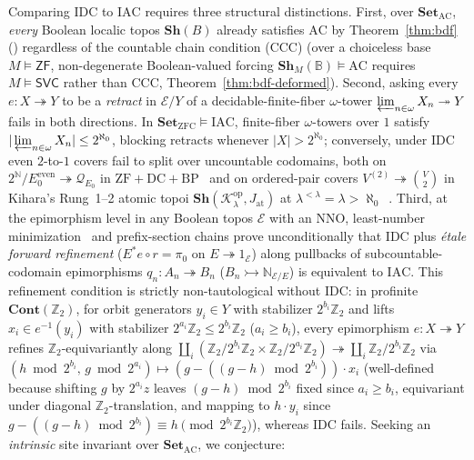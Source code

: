 Comparing $\mathrm{IDC}$ to $\mathrm{IAC}$ requires three structural distinctions. First, over $\mathbf{Set}_{\mathrm{AC}}$, \emph{every} Boolean localic topos $\mathbf{Sh}(B)$ already satisfies $\mathrm{AC}$ by Theorem~\ref{thm:bdf}~\cite{Barr74} (\cite[\S D4.5]{Johnstone02}) regardless of the countable chain condition ($\mathrm{CCC}$) (over a choiceless base $M \models \mathsf{ZF}$, non-degenerate Boolean-valued forcing $\mathbf{Sh}_M(\mathbb{B}) \models \mathrm{AC}$ requires $M \models \mathsf{SVC}$ rather than $\mathrm{CCC}$, Theorem~\ref{thm:bdf-deformed}). Second, asking every $e : X \twoheadrightarrow Y$ to be a \emph{retract} in $\mathcal{E}/Y$ of a decidable-finite-fiber $\omega$-tower $\varprojlim_{n \in \omega} X_n \twoheadrightarrow Y$ fails in both directions. In $\mathbf{Set}_{\mathrm{ZFC}} \models \mathrm{IAC}$, finite-fiber $\omega$-towers over $1$ satisfy $|\varprojlim_{n \in \omega} X_n| \le 2^{\aleph_0}$, blocking retracts whenever $|X| > 2^{\aleph_0}$; conversely, under $\mathrm{IDC}$ even $2$-to-$1$ covers fail to split over uncountable codomains, both on $2^{\mathbb{N}}/E_0^{\mathrm{even}} \twoheadrightarrow \mathcal{Q}_{E_0}$ in $\mathrm{ZF}+\mathrm{DC}+\mathrm{BP}$~\cite{Serafin23} and on ordered-pair covers $V^{(2)} \twoheadrightarrow \binom{V}{2}$ in Kihara's Rung~1--2 atomic topoi $\mathbf{Sh}(\mathcal{K}_\lambda^{\mathrm{op}}, J_{\mathrm{at}})$ at $\lambda^{<\lambda}=\lambda>\aleph_0$~\cite{Kihara26}. Third, at the epimorphism level in any Boolean topos $\mathcal{E}$ with an $\mathrm{NNO}$, least-number minimization~\cite[\S D5.1]{Johnstone02} and prefix-section chains prove unconditionally that $\mathrm{IDC}$ plus \emph{\'etale forward refinement} ($E^* e \circ r = \pi_0$ on $E \twoheadrightarrow 1_{\mathcal{E}}$) along pullbacks of subcountable-codomain epimorphisms $q_n : A_n \twoheadrightarrow B_n$ ($B_n \rightarrowtail \mathbb{N}_{\mathcal{E}/E}$) is equivalent to $\mathrm{IAC}$. This refinement condition is strictly non-tautological without $\mathrm{IDC}$: in profinite $\mathbf{Cont}(\mathbb{Z}_2)$, for orbit generators $y_i \in Y$ with stabilizer $2^{b_i}\mathbb{Z}_2$ and lifts $x_i \in e^{-1}(y_i)$ with stabilizer $2^{a_i}\mathbb{Z}_2 \le 2^{b_i}\mathbb{Z}_2$ ($a_i \ge b_i$), every epimorphism $e : X \twoheadrightarrow Y$ refines $\mathbb{Z}_2$-equivariantly along $\coprod_i (\mathbb{Z}_2/2^{b_i}\mathbb{Z}_2 \times \mathbb{Z}_2/2^{a_i}\mathbb{Z}_2) \twoheadrightarrow \coprod_i \mathbb{Z}_2/2^{b_i}\mathbb{Z}_2$ via $(h \bmod 2^{b_i},\, g \bmod 2^{a_i}) \mapsto (g - ((g - h) \bmod 2^{b_i})) \cdot x_i$ (well-defined because shifting $g$ by $2^{a_i}z$ leaves $(g-h) \bmod 2^{b_i}$ fixed since $a_i \ge b_i$, equivariant under diagonal $\mathbb{Z}_2$-translation, and mapping to $h \cdot y_i$ since $g - ((g-h)\bmod 2^{b_i}) \equiv h \pmod{2^{b_i}\mathbb{Z}_2}$), whereas $\mathrm{IDC}$ fails. Seeking an \emph{intrinsic} site invariant over $\mathbf{Set}_{\mathrm{AC}}$, we conjecture:


